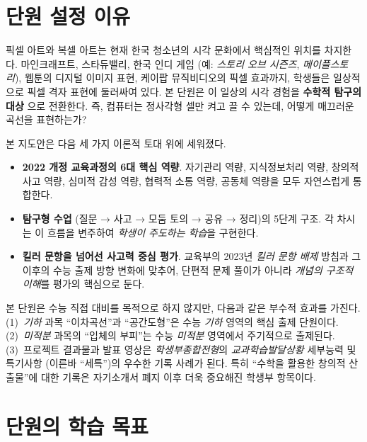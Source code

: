 \documentclass[12pt,a4paper]{scrartcl}
\newcommand{\acc}[1]{\textcolor{accent}{\textbf{#1}}}
\begin{document}
\section{단원 설정 이유}

픽셀 아트와 복셀 아트는 현재 한국 청소년의 시각 문화에서 핵심적인 위치를 차지한다. 마인크래프트, 스타듀밸리, 한국 인디 게임 (예: \emph{스토리 오브 시즌즈}, \emph{메이플스토리}), 웹툰의 디지털 이미지 표현, 케이팝 뮤직비디오의 픽셀 효과까지, 학생들은 일상적으로 픽셀 격자 표현에 둘러싸여 있다. 본 단원은 이 일상의 시각 경험을 \acc{수학적 탐구의 대상} 으로 전환한다. 즉, 컴퓨터는 정사각형 셀만 켜고 끌 수 있는데, 어떻게 매끄러운 곡선을 표현하는가?

본 지도안은 다음 세 가지 이론적 토대 위에 세워졌다.

\begin{itemize}[leftmargin=1.3em,itemsep=0.15em,topsep=0.3em]
  \item \acc{2022 개정 교육과정의 6대 핵심 역량}. 자기관리 역량, 지식정보처리 역량, 창의적 사고 역량, 심미적 감성 역량, 협력적 소통 역량, 공동체 역량을 모두 자연스럽게 통합한다.
  \item \acc{탐구형 수업} (질문 → 사고 → 모둠 토의 → 공유 → 정리)의 5단계 구조. 각 차시는 이 흐름을 변주하여 \emph{학생이 주도하는 학습}을 구현한다.
  \item \acc{킬러 문항을 넘어선 사고력 중심 평가}. 교육부의 2023년 \emph{킬러 문항 배제} 방침과 그 이후의 수능 출제 방향 변화에 맞추어, 단편적 문제 풀이가 아니라 \emph{개념의 구조적 이해}를 평가의 핵심으로 둔다.
\end{itemize}

\begin{yuui}[수능 및 학종과의 관계]
본 단원은 수능 직접 대비를 목적으로 하지 않지만, 다음과 같은 부수적 효과를 가진다. (1)~\emph{기하} 과목 ``이차곡선''과 ``공간도형''은 수능 \emph{기하} 영역의 핵심 출제 단원이다. (2)~\emph{미적분} 과목의 ``입체의 부피''는 수능 \emph{미적분} 영역에서 주기적으로 출제된다. (3)~프로젝트 결과물과 발표 영상은 \emph{학생부종합전형}의 \emph{교과학습발달상황} 세부능력 및 특기사항 (이른바 ``세특'')의 우수한 기록 사례가 된다. 특히 ``수학을 활용한 창의적 산출물''에 대한 기록은 자기소개서 폐지 이후 더욱 중요해진 학생부 항목이다.
\end{yuui}

\section{단원의 학습 목표}
\end{document}
